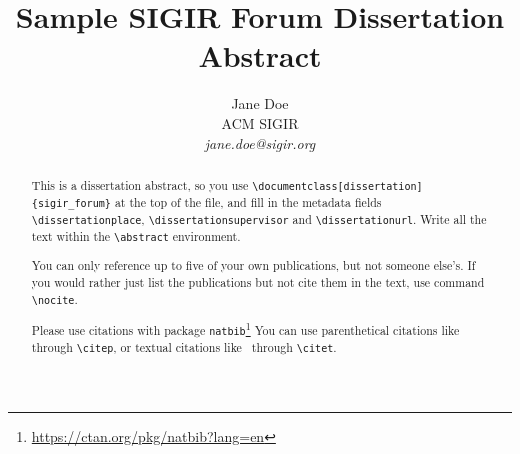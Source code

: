 \documentclass[dissertation]{sigir_forum}
\begin{document}
\title{Sample SIGIR Forum Dissertation Abstract}

\author{
Jane Doe\\ACM SIGIR\\\emph{jane.doe@sigir.org}
}

\maketitle 
\begin{abstract}
This is a dissertation abstract, so you use \texttt{\textbackslash documentclass[dissertation]\{sigir\_forum\}} at the top of the file, and fill in the metadata fields \texttt{\textbackslash dissertationplace}, \texttt{\textbackslash dissertationsupervisor} and \texttt{\textbackslash dissertationurl}. Write all the text within the \texttt{\textbackslash abstract} environment.

You can only reference up to five of your own publications, but not someone else's. If you would rather just list the publications but not cite them in the text, use command \texttt{\textbackslash nocite}.

Please use citations with package \texttt{natbib}\footnote{\url{https://ctan.org/pkg/natbib?lang=en}}
You can use parenthetical citations like~\citep{forum} through \texttt{\textbackslash citep}, or textual citations like~\citet{forum} through \texttt{\textbackslash citet}.
\end{abstract}


\end{document}
